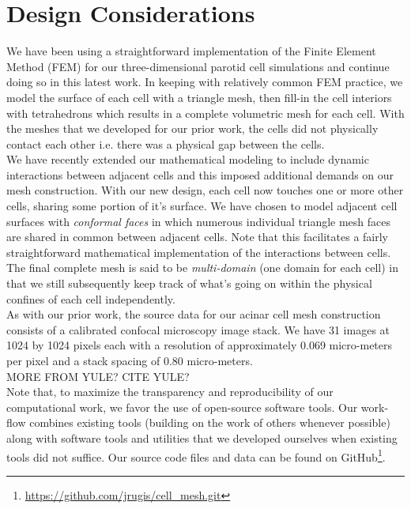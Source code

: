 \documentclass[a4paper,10pt]{article}
\begin{document}
\section{Design Considerations}
We have been using a straightforward implementation of the Finite Element Method (FEM) \cite{gockenbach2006understanding,Hughes2000,gosz2005finite} for our three-dimensional parotid cell simulations and continue doing so in this latest work. In keeping with relatively common FEM practice, we model the surface of each cell with a triangle mesh, then fill-in the cell interiors with tetrahedrons which results in a complete volumetric mesh for each cell. With the meshes that we developed for our prior work, the cells did not physically contact each other i.e. there was a physical gap between the cells.\\

We have recently extended our mathematical modeling to include dynamic interactions between adjacent cells and this imposed additional demands on our mesh construction. With our new design, each cell now touches one or more other cells, sharing some portion of it's surface. We have chosen to model adjacent cell surfaces with \emph{conformal faces} in which numerous individual triangle mesh faces are shared in common between adjacent cells. Note that this facilitates a fairly straightforward mathematical implementation of the interactions between cells. The final complete mesh is said to be \emph{multi-domain} (one domain for each cell) in that we still subsequently keep track of what's going on within the physical confines of each cell independently. \\

As with our prior work, the source data for our acinar cell mesh construction consists of a calibrated confocal microscopy image stack. We have 31 images at 1024 by 1024 pixels each with a resolution of approximately 0.069 micro-meters per pixel and a stack spacing of 0.80 micro-meters. \\ 

MORE FROM YULE? CITE YULE?\\

Note that, to maximize the transparency and reproducibility of our computational work, we favor the use of open-source software tools. Our work-flow combines existing tools (building on the work of others whenever possible) along with software tools and utilities that we developed ourselves when existing tools did not suffice. Our source code files and data can be found on GitHub\footnote{\url{https://github.com/jrugis/cell_mesh.git}}.\\
\end{document}
